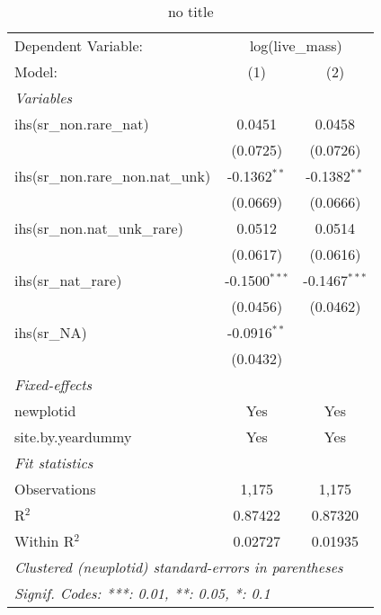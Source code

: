 
\begin{table}[htbp]
   \caption{no title}
   \centering
   \begin{tabular}{lcc}
      \tabularnewline \midrule \midrule
      Dependent Variable: & \multicolumn{2}{c}{log(live\_mass)}\\
      Model:                             & (1)             & (2)\\  
      \midrule
      \emph{Variables}\\
      ihs(sr\_non.rare\_nat)             & 0.0451          & 0.0458\\   
                                         & (0.0725)        & (0.0726)\\   
      ihs(sr\_non.rare\_non.nat\_unk)    & -0.1362$^{**}$  & -0.1382$^{**}$\\   
                                         & (0.0669)        & (0.0666)\\   
      ihs(sr\_non.nat\_unk\_rare)        & 0.0512          & 0.0514\\   
                                         & (0.0617)        & (0.0616)\\   
      ihs(sr\_nat\_rare)                 & -0.1500$^{***}$ & -0.1467$^{***}$\\   
                                         & (0.0456)        & (0.0462)\\   
      ihs(sr\_NA)                        & -0.0916$^{**}$  &   \\   
                                         & (0.0432)        &   \\   
      \midrule
      \emph{Fixed-effects}\\
      newplotid                          & Yes             & Yes\\  
      site.by.yeardummy                  & Yes             & Yes\\  
      \midrule
      \emph{Fit statistics}\\
      Observations                       & 1,175           & 1,175\\  
      R$^2$                              & 0.87422         & 0.87320\\  
      Within R$^2$                       & 0.02727         & 0.01935\\  
      \midrule \midrule
      \multicolumn{3}{l}{\emph{Clustered (newplotid) standard-errors in parentheses}}\\
      \multicolumn{3}{l}{\emph{Signif. Codes: ***: 0.01, **: 0.05, *: 0.1}}\\
   \end{tabular}
\end{table}


